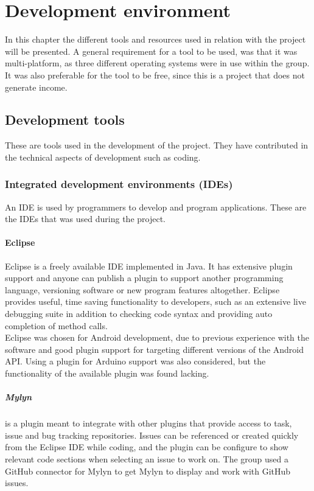 \chapter{Development environment}
In this chapter the different tools and resources used in relation with the project will be presented. A general requirement for a tool to be used, was that it was multi-platform, as three different operating systems were in use within the group. It was also preferable for the tool to be free, since this is a project that does not generate income.

\section{Development tools}
These are tools used in the development of the project. They have contributed in the technical aspects of development such as coding.
\subsection{Integrated development environments (IDEs)}
An IDE is used by programmers to develop and program applications. These are the IDEs that was used during the project.

\subsubsection{Eclipse}
Eclipse is a freely available IDE implemented in Java. It has extensive plugin support and anyone can publish a plugin to support another programming language, versioning software or new program features altogether. Eclipse provides useful, time saving functionality to developers, such as an extensive live debugging suite in addition to checking code syntax and providing auto completion of method calls.\\
\newline
Eclipse was chosen for Android development, due to previous experience with the software and good plugin support for targeting different versions of the Android API. Using a plugin for Arduino support was also considered, but the functionality of the available plugin was found lacking. %

\paragraph{Mylyn}
is a plugin meant to integrate with other plugins that provide access to task, issue and bug tracking repositories. Issues can be referenced or created quickly from the Eclipse IDE while coding, and the plugin can be configure to show relevant code sections when selecting an issue to work on. The group used a GitHub connector for Mylyn to get Mylyn to display and work with GitHub issues.

